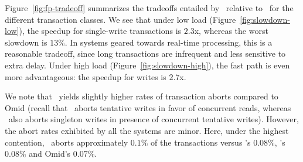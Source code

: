 Figure~\ref{fig:fp-tradeoff} summarizes the tradeoffs entailed by \sys\ relative to \sysll\ for the different transaction classes. 
We see that under low load (Figure~\ref{fig:slowdown-low}),
the speedup for single-write transactions is $2.3$x, whereas the worst slowdown is $13\%$. 
In systems geared towards real-time processing, this is a reasonable tradeoff, since long transactions 
are infrequent and less sensitive to extra delay.
Under high load (Figure~\ref{fig:slowdown-high}), the fast path is even more advantageous: the speedup for writes is $2.7$x.



We note that \sys\ yields slightly higher rates of transaction aborts compared to Omid 
(recall that \sysll\ aborts tentative writes in favor of concurrent reads, whereas  \sys\ also aborts
singleton writes in presence of concurrent tentative writes). However, the abort rates exhibited by all  
the systems are minor. 
Here, under the highest contention,  \sys\ aborts approximately $0.1\%$ 
of the transactions versus  \sysll's $0.08\%$,   
 \syspc's $0.08\%$ 
and Omid's $0.07\%$. 

